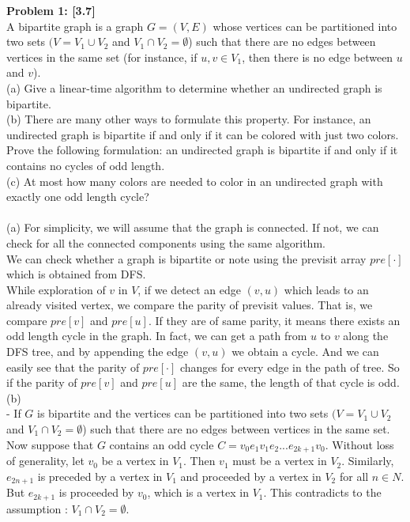 \documentclass{article}
\begin{document}
\noindent
{\bf Problem 1: [3.7]}\\
A bipartite graph is a graph $G = (V, E)$ whose vertices can be partitioned into two sets $(V = V_1\cup V_2$ and $V_1 \cap V_2 = \emptyset$) such that there are no edges between vertices in the same set (for instance, if $u, v \in V_1$, then there is no edge between $u$ and $v$).\\
(a) Give a linear-time algorithm to determine whether an undirected graph is bipartite.\\
(b) There are many other ways to formulate this property. For instance, an undirected graph
is bipartite if and only if it can be colored with just two colors.
Prove the following formulation: an undirected graph is bipartite if and only if it contains
no cycles of odd length.\\
(c) At most how many colors are needed to color in an undirected graph with exactly one odd length cycle?\\
\\
\noindent
(a) 
For simplicity, we will assume that the graph is connected. If not, we can check for all the connected components using the same algorithm.\\
We can check whether a graph is bipartite or note using the previsit array $pre[\cdot]$ which is obtained from DFS.\\
While exploration of $v$ in $V$, if we detect an edge $(v,u)$ which leads to an already visited vertex, we compare the parity of previsit values. That is, we compare $pre[v]$ and $pre[u]$. If they are of same parity, it means there exists an odd length cycle in the graph.
In fact, we can get a path from $u$ to $v$ along the DFS tree, and by appending the edge $(v, u)$ we obtain a cycle. And we can easily see that the parity of $pre[\cdot]$ changes for every edge in the path of tree. So if the parity of $pre[v]$ and $pre[u]$ are the same, the length of that cycle is odd. \\
(b)
\\- If $G$ is bipartite and the vertices can be partitioned into two sets $(V = V_1\cup V_2$ and $V_1 \cap V_2 = \emptyset$) such that there are no edges between vertices in the same set. Now suppose that $G$ contains an odd cycle $C = v_0e_1v_1e_2...e_{2k+1}v_0$. Without loss of generality, let $v_0$ be a vertex in $V_1$. Then $v_1$ must be a vertex in $V_2$.
Similarly, $e_{2n+1}$ is preceded by a vertex in $V_1$ and proceeded by a vertex in $V_2$ for all $n\in N$. But $e_{2k+1}$ is proceeded by $v_0$, which is a vertex in $V_1$. This contradicts to the assumption : $V_1\cap V_2=\emptyset$.\\
\end{document}
